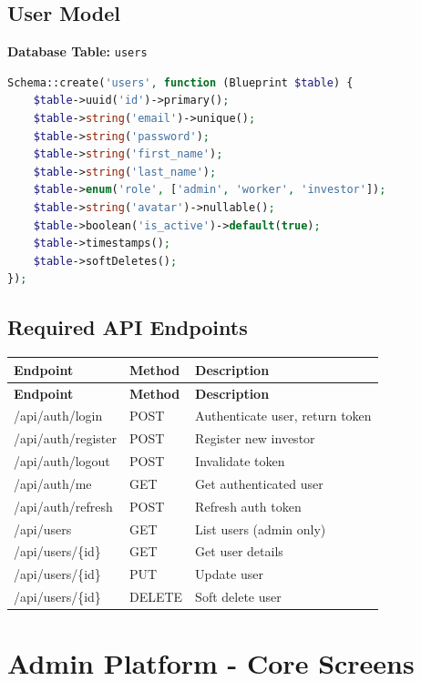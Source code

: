 \documentclass[11pt,a4paper]{article}
\begin{document}
\subsection{User Model}
\textbf{Database Table:} \texttt{users}

\begin{lstlisting}[language=php]
Schema::create('users', function (Blueprint $table) {
    $table->uuid('id')->primary();
    $table->string('email')->unique();
    $table->string('password');
    $table->string('first_name');
    $table->string('last_name');
    $table->enum('role', ['admin', 'worker', 'investor']);
    $table->string('avatar')->nullable();
    $table->boolean('is_active')->default(true);
    $table->timestamps();
    $table->softDeletes();
});
\end{lstlisting}

\subsection{Required API Endpoints}

\begin{longtable}{|p{3cm}|p{2cm}|p{8cm}|}
\hline
\textbf{Endpoint} & \textbf{Method} & \textbf{Description} \\
\hline
\endfirsthead
\hline
\textbf{Endpoint} & \textbf{Method} & \textbf{Description} \\
\hline
\endhead

/api/auth/login & POST & Authenticate user, return token \\
/api/auth/register & POST & Register new investor \\
/api/auth/logout & POST & Invalidate token \\
/api/auth/me & GET & Get authenticated user \\
/api/auth/refresh & POST & Refresh auth token \\
/api/users & GET & List users (admin only) \\
/api/users/\{id\} & GET & Get user details \\
/api/users/\{id\} & PUT & Update user \\
/api/users/\{id\} & DELETE & Soft delete user \\
\hline
\end{longtable}

\newpage

\section{Admin Platform - Core Screens}
\end{document}
